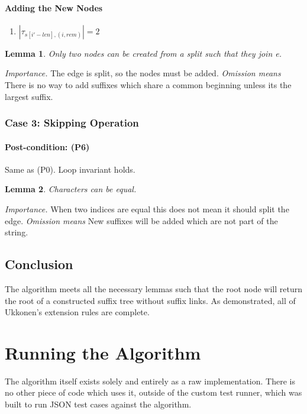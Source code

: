 \documentclass{article}
\newtheorem{lemma}{Lemma}[section]
\begin{document}
	\paragraph{Adding the New Nodes}
	\begin{enumerate}[label=(P5.d.\arabic*), ref=(P3.a.\arabic*)]
		\item $|\tau_{s[i\prime - len], (i, rem)}| = 2$ 
	\end{enumerate}
	
	\begin{lemma}
		Only two nodes can be created from a split such that they join e.
	\end{lemma}
	
	\textit{Importance.}  The edge is split, so the nodes must be added.
	\textit{Omission means} There is no way to add suffixes which share a common beginning unless its the largest suffix.
	
	\subsubsection{Case 3: Skipping Operation}
	\paragraph{Post-condition: (P6)} Same as (P0).  Loop invariant holds.
	
	\begin{lemma}
		Characters can be equal.
	\end{lemma}
	
	\textit{Importance.} When two indices are equal this does not mean it should split the edge.
	\textit{Omission means}  New suffixes will be added which are not part of the string.
	
	\subsection{Conclusion}
	The algorithm meets all the necessary lemmas such that the root node will return the root of a constructed suffix tree without suffix links.  As demonstrated, all of Ukkonen's extension rules are complete.
		
	\section{Running the Algorithm}
	The algorithm itself exists solely and entirely as a raw implementation.  There is no other piece of code which uses it, outside of the custom test runner, which was built to run JSON test cases against the algorithm.
	
\end{document}
